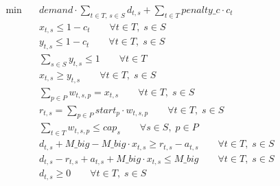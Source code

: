 \begin{align}
  \min\quad & \mathit{demand} \cdot \sum_{t \in T,\, s \in S} d_{t,s}
            + \sum_{t \in T} \mathit{penalty\_c} \cdot c_{t} \tag{obj} \\
  & x_{t,s} \le 1 - c_{t} \qquad \forall t \in T,\; s \in S \tag{cancel\_stop} \\
  & y_{t,s} \le 1 - c_{t} \qquad \forall t \in T,\; s \in S \tag{cancel\_shortturn} \\
  & \sum_{s \in S} y_{t,s} \le 1 \qquad \forall t \in T \tag{shortturn\_one} \\
  & x_{t,s} \ge y_{t,s} \qquad \forall t \in T,\; s \in S \tag{shortturn\_stop} \\
  & \sum_{p \in P} w_{t,s,p} = x_{t,s} \qquad \forall t \in T,\; s \in S \tag{slot\_assign} \\
  & r_{t,s} = \sum_{p \in P} \mathit{start}_{p} \cdot w_{t,s,p} \qquad \forall t \in T,\; s \in S \tag{time\_link} \\
  & \sum_{t \in T} w_{t,s,p} \le \mathit{cap}_{s} \qquad \forall s \in S,\; p \in P \tag{capacity} \\
  & d_{t,s} + \mathit{M\_big} - \mathit{M\_big} \cdot x_{t,s} \ge r_{t,s} - \mathit{a}_{t,s} \qquad \forall t \in T,\; s \in S \tag{delay\_low} \\
  & d_{t,s} - r_{t,s} + \mathit{a}_{t,s} + \mathit{M\_big} \cdot x_{t,s} \le \mathit{M\_big} \qquad \forall t \in T,\; s \in S \tag{delay\_up} \\
  & d_{t,s} \ge 0 \qquad \forall t \in T,\; s \in S \tag{delay\_nonneg}
\end{align}